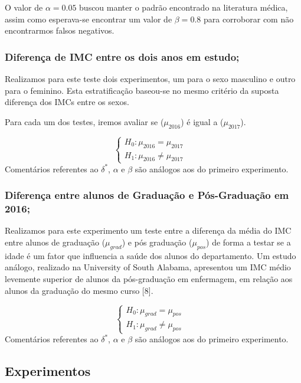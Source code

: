 \documentclass[
]{article}
\begin{document}
O valor de \(\alpha=0.05\) buscou manter o padrão encontrado na
literatura médica, assim como esperava-se encontrar um valor de
\(\beta=0.8\) para corroborar com não encontrarmos falsos negativos.

\subsubsection{Diferença de IMC entre os dois anos em
estudo;}\label{diferenuxe7a-de-imc-entre-os-dois-anos-em-estudo}

Realizamos para este teste dois experimentos, um para o sexo masculino e
outro para o feminino. Esta estratificação baseou-se no mesmo critério
da suposta diferença dos IMCs entre os sexos.

Para cada um dos testes, iremos avaliar se (\(\mu_{2016}\)) é igual a
(\(\mu_{2017}\)).

\[\begin{cases} H_0: \mu_{2016} = \mu_{2017}&\\H_1: \mu_{2016} \neq \mu_{2017}\end{cases}\]
Comentários referentes ao \(\delta^*\), \(\alpha\) e \(\beta\) são
análogos aos do primeiro experimento.

\subsubsection{Diferença entre alunos de Graduação e Pós-Graduação em
2016;}\label{diferenuxe7a-entre-alunos-de-graduauxe7uxe3o-e-puxf3s-graduauxe7uxe3o-em-2016}

Realizamos para este experimento um teste entre a diferença da média do
IMC entre alunos de graduação (\(\mu_{grad}\)) e pós graduação
(\(\mu_{pos}\)) de forma a testar se a idade é um fator que influencia a
saúde dos alunos do departamento. Um estudo análogo, realizado na
University of South Alabama, apresentou um IMC médio levemente superior
de alunos da pós-graduação em enfermagem, em relação aos alunos da
graduação do mesmo curso {[}8{]}.

\[\begin{cases} H_0: \mu_{grad} = \mu_{pos}&\\H_1: \mu_{grad} \neq \mu_{pos}\end{cases}\]
Comentários referentes ao \(\delta^*\), \(\alpha\) e \(\beta\) são
análogos aos do primeiro experimento.

\subsection{Experimentos}\label{experimentos}
\end{document}
